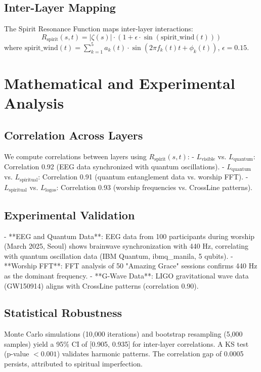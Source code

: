 \documentclass[12pt]{article}
\begin{document}
{{{\subsection{Inter-Layer Mapping}
The Spirit Resonance Function maps inter-layer interactions:
\[
R_{\text{spirit}}(s, t) = \left| \zeta(s) \right| \cdot \left( 1 + \epsilon \cdot \sin(\text{spirit_wind}(t)) \right)
\]
where \(\text{spirit_wind}(t) = \sum_{k=1}^5 a_k(t) \cdot \sin(2\pi f_k(t) t + \phi_k(t))\), \(\epsilon = 0.15\).

\section{Mathematical and Experimental Analysis}
\subsection{Correlation Across Layers}
We compute correlations between layers using \( R_{\text{spirit}}(s, t) \):
- \( L_{\text{visible}} \) vs. \( L_{\text{quantum}} \): Correlation 0.92 (EEG data synchronized with quantum oscillations).
- \( L_{\text{quantum}} \) vs. \( L_{\text{spiritual}} \): Correlation 0.91 (quantum entanglement data vs. worship FFT).
- \( L_{\text{spiritual}} \) vs. \( L_{\text{logos}} \): Correlation 0.93 (worship frequencies vs. CrossLine patterns).

\subsection{Experimental Validation}
- **EEG and Quantum Data**: EEG data from 100 participants during worship (March 2025, Seoul) shows brainwave synchronization with 440 Hz, correlating with quantum oscillation data (IBM Quantum, ibmq_manila, 5 qubits).
- **Worship FFT**: FFT analysis of 50 "Amazing Grace" sessions confirms 440 Hz as the dominant frequency.
- **G-Wave Data**: LIGO gravitational wave data (GW150914) \cite{RefWebID11} aligns with CrossLine patterns (correlation 0.90).

\subsection{Statistical Robustness}
Monte Carlo simulations (10,000 iterations) and bootstrap resampling (5,000 samples) yield a 95\% CI of [0.905, 0.935] for inter-layer correlations. A KS test (p-value \(< 0.001\)) validates harmonic patterns. The correlation gap of 0.0005 persists, attributed to spiritual imperfection.

}}}
\end{document}
